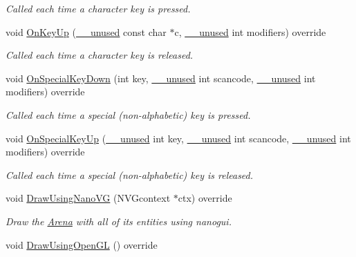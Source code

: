 \begin{DoxyCompactItemize}
\begin{DoxyCompactList}\small\item\em Called each time a character key is pressed. \end{DoxyCompactList}\item 
void \hyperlink{classGraphicsArenaViewer_ac3e749f6a75bdd5b32d23c9c8913f9d8}{On\+Key\+Up} (\hyperlink{common_8h_a2e3484535ee610c8e19e9859563abe48}{\+\_\+\+\_\+unused} const char $\ast$c, \hyperlink{common_8h_a2e3484535ee610c8e19e9859563abe48}{\+\_\+\+\_\+unused} int modifiers) override
\begin{DoxyCompactList}\small\item\em Called each time a character key is released. \end{DoxyCompactList}\item 
void \hyperlink{classGraphicsArenaViewer_ab6ed6287ddf72f43f605482ce77b01a2}{On\+Special\+Key\+Down} (int key, \hyperlink{common_8h_a2e3484535ee610c8e19e9859563abe48}{\+\_\+\+\_\+unused} int scancode, \hyperlink{common_8h_a2e3484535ee610c8e19e9859563abe48}{\+\_\+\+\_\+unused} int modifiers) override
\begin{DoxyCompactList}\small\item\em Called each time a special (non-\/alphabetic) key is pressed. \end{DoxyCompactList}\item 
void \hyperlink{classGraphicsArenaViewer_a086e2e29e1a5745a8ee4f12996897b22}{On\+Special\+Key\+Up} (\hyperlink{common_8h_a2e3484535ee610c8e19e9859563abe48}{\+\_\+\+\_\+unused} int key, \hyperlink{common_8h_a2e3484535ee610c8e19e9859563abe48}{\+\_\+\+\_\+unused} int scancode, \hyperlink{common_8h_a2e3484535ee610c8e19e9859563abe48}{\+\_\+\+\_\+unused} int modifiers) override
\begin{DoxyCompactList}\small\item\em Called each time a special (non-\/alphabetic) key is released. \end{DoxyCompactList}\item 
void \hyperlink{classGraphicsArenaViewer_a7d59755e3f7674f382127fe135492eeb}{Draw\+Using\+Nano\+VG} (N\+V\+Gcontext $\ast$ctx) override
\begin{DoxyCompactList}\small\item\em Draw the \hyperlink{classArena}{Arena} with all of its entities using {\ttfamily nanogui}. \end{DoxyCompactList}\item 
void \hyperlink{classGraphicsArenaViewer_af894508bfa039199c6ff7f1b5a7da158}{Draw\+Using\+Open\+GL} () override\hypertarget{classGraphicsArenaViewer_af894508bfa039199c6ff7f1b5a7da158}{}\label{classGraphicsArenaViewer_af894508bfa039199c6ff7f1b5a7da158}


\end{DoxyCompactItemize}

